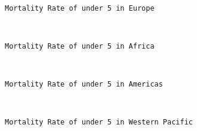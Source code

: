 \documentclass[11pt]{article}
\begin{document}
    \begin{center}
    \end{center}
    { \hspace*{\fill} \\}
    
    \begin{Verbatim}[commandchars=\\\{\}]
Mortality Rate of under 5 in Europe

    \end{Verbatim}

    \begin{center}
    \end{center}
    { \hspace*{\fill} \\}
    
    \begin{Verbatim}[commandchars=\\\{\}]
Mortality Rate of under 5 in Africa

    \end{Verbatim}

    \begin{center}
    \end{center}
    { \hspace*{\fill} \\}
    
    \begin{Verbatim}[commandchars=\\\{\}]
Mortality Rate of under 5 in Americas

    \end{Verbatim}

    \begin{center}
    \end{center}
    { \hspace*{\fill} \\}
    
    \begin{Verbatim}[commandchars=\\\{\}]
Mortality Rate of under 5 in Western Pacific

    \end{Verbatim}

    \begin{center}
    \end{center}
    { \hspace*{\fill} \\}
    
\end{document}

